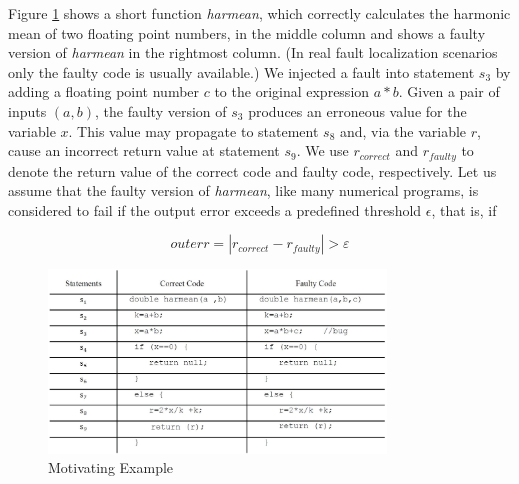 Figure \ref{code} shows a short function {\it harmean}, which correctly calculates the harmonic mean of two floating point numbers, in the middle column and shows a faulty version of {\it harmean} in the rightmost column.  (In real fault localization scenarios only the faulty code is usually available.)  We injected a fault into statement $s_3$ by adding a floating point number $c$ to the original expression $a*b$.  Given a pair of inputs $(a,b)$, the faulty version of $s_3$ produces an erroneous value for the variable $x$.  This value may propagate to statement $s_8$ and, via the variable $r$, cause an incorrect return value at statement $s_9$.  We use $r_{correct}$ and $r_{faulty}$ to denote the return value of the correct code and faulty code, respectively.  Let us assume that the faulty version of {\it harmean}, like many numerical programs, is considered to fail if the output error exceeds a predefined threshold $\epsilon$, that is, if

\begin{equation*}\label{threshold}
outerr = |{r_{correct}} - {r_{faulty}}| > \varepsilon
\end{equation*}

\begin{figure}[!thpb]
\centering
\includegraphics[width=0.8\textwidth]{MotivatingExample.eps}
\caption{Motivating Example}
\label{code}
\end{figure}

